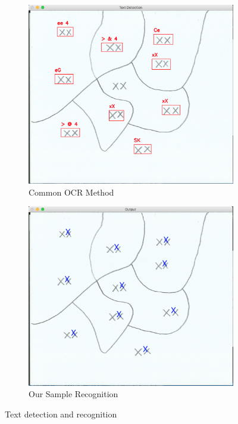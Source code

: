 \documentclass[conference]{IEEEtran}
\begin{document}
\begin{figure}[h]
     \centering
     \begin{subfigure}[b]{0.4\textwidth}
         \centering
         \includegraphics[width=\textwidth]{ocrprior}
         \caption{Common OCR Method}
         \label{fig:ocrprior}
     \end{subfigure}
     \hfill
     \begin{subfigure}[b]{0.4\textwidth}
         \centering
         \includegraphics[width=\textwidth]{textrec}
         \caption{Our Sample Recognition}
         \label{fig:textrec}
     \end{subfigure}
        \caption{Text detection and recognition}
        \label{fig:texttest}
\end{figure}
\end{document}

